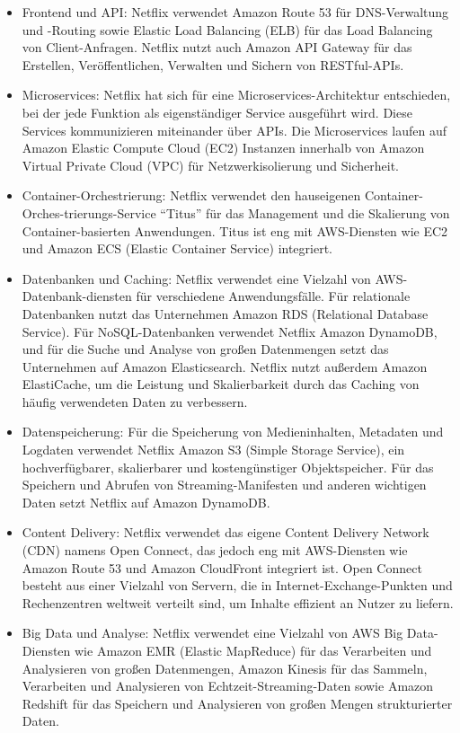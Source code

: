 \begin{itemize}
\item Frontend und API: Netflix verwendet Amazon Route 53 für DNS-Verwaltung und -Routing sowie Elastic Load Balancing (ELB) für das Load Balancing von Client-Anfragen. Netflix nutzt auch Amazon API Gateway für das Erstellen, Veröffentlichen, Verwalten und Sichern von RESTful-APIs.
\item Microservices: Netflix hat sich für eine Microservices-Architektur entschieden, bei der jede Funktion als eigenständiger Service ausgeführt wird. Diese Services kommunizieren miteinander über APIs. Die Microservices laufen auf Amazon Elastic Compute Cloud (EC2) Instanzen innerhalb von Amazon Virtual Private Cloud (VPC) für Netzwerkisolierung und Sicherheit.
\item Container-Orchestrierung: Netflix verwendet den hauseigenen Container-Orches-trierungs-Service \enquote{Titus} für das Management und die Skalierung von Container-basierten Anwendungen. Titus ist eng mit AWS-Diensten wie EC2 und Amazon ECS (Elastic Container Service) integriert.
\item Datenbanken und Caching: Netflix verwendet eine Vielzahl von AWS-Datenbank-diensten für verschiedene Anwendungsfälle. Für relationale Datenbanken nutzt das Unternehmen Amazon RDS (Relational Database Service). Für NoSQL-Datenbanken verwendet Netflix Amazon DynamoDB, und für die Suche und Analyse von großen Datenmengen setzt das Unternehmen auf Amazon Elasticsearch. Netflix nutzt außerdem Amazon ElastiCache, um die Leistung und Skalierbarkeit durch das Caching von häufig verwendeten Daten zu verbessern.
\item Datenspeicherung: Für die Speicherung von Medieninhalten, Metadaten und Logdaten verwendet Netflix Amazon S3 (Simple Storage Service), ein hochverfügbarer, skalierbarer und kostengünstiger Objektspeicher. Für das Speichern und Abrufen von Streaming-Manifesten und anderen wichtigen Daten setzt Netflix auf Amazon DynamoDB.
\item Content Delivery: Netflix verwendet das eigene Content Delivery Network (CDN) namens Open Connect, das jedoch eng mit AWS-Diensten wie Amazon Route 53 und Amazon CloudFront integriert ist. Open Connect besteht aus einer Vielzahl von Servern, die in Internet-Exchange-Punkten und Rechenzentren weltweit verteilt sind, um Inhalte effizient an Nutzer zu liefern.
\item Big Data und Analyse: Netflix verwendet eine Vielzahl von AWS Big Data-Diensten wie Amazon EMR (Elastic MapReduce) für das Verarbeiten und Analysieren von großen Datenmengen, Amazon Kinesis für das Sammeln, Verarbeiten und Analysieren von Echtzeit-Streaming-Daten sowie Amazon Redshift für das Speichern und Analysieren von großen Mengen strukturierter Daten.

\end{itemize}
